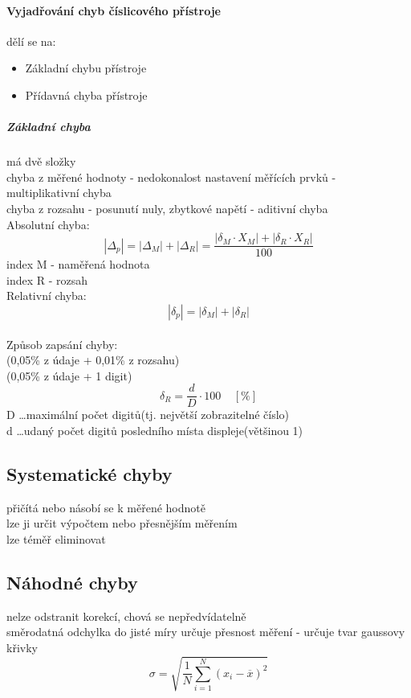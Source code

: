 \paragraph*{Vyjadřování chyb číslicového přístroje}
dělí se na:
\begin{itemize}
    \item Základní chybu přístroje
    \item Přídavná chyba přístroje
\end{itemize}
\subparagraph*{Základní chyba}
má dvě složky \\
chyba z měřené hodnoty - nedokonalost nastavení měřících prvků - multiplikativní chyba\\
chyba z rozsahu - posunutí nuly, zbytkové napětí - aditivní chyba\\
Absolutní chyba:
\begin{equation}
    |\Delta_p| = |\Delta_M| + |\Delta_R| = \frac{|\delta_M \cdot X_M|+|\delta_R \cdot X_R|}{100}
\end{equation}
index M - naměřená hodnota \\
index R - rozsah \\
Relativní chyba:
\begin{equation}
    |\delta_p| = |\delta_M| + |\delta_R|
\end{equation}
\\
Způsob zapsání chyby:\\
\textpm(0,05\% z údaje + 0,01\% z rozsahu)\\
\textpm(0,05\% z údaje + 1 digit)
\begin{equation}
    \delta_R = \frac{d}{D}\cdot 100 \;\;\;\;[\%]
\end{equation}
D \dots maximální počet digitů(tj. největší zobrazitelné číslo) \\
d \dots udaný počet digitů posledního místa displeje(většinou 1)\\
\subsection*{Systematické chyby}
přičítá nebo násobí se k měřené hodnotě\\ lze ji určit výpočtem nebo přesnějším
měřením\\ lze téměř eliminovat\\

\subsection*{Náhodné chyby}
nelze odstranit korekcí, chová se nepředvídatelně\\ směrodatná odchylka do
jisté míry určuje přesnost měření - určuje tvar gaussovy křivky
\begin{equation}
    \sigma = \sqrt{\frac{1}{N}\sum^N_{i=1}(x_i-\overline{x})^2}
\end{equation}

